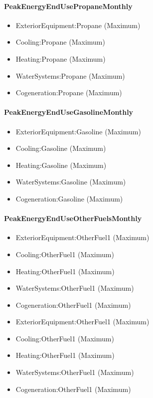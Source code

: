 \paragraph{PeakEnergyEndUsePropaneMonthly}\label{peakenergyendusepropanemonthly}

\begin{itemize}
\item
  ExteriorEquipment:Propane (Maximum)
\item
  Cooling:Propane (Maximum)
\item
  Heating:Propane (Maximum)
\item
  WaterSystems:Propane (Maximum)
\item
  Cogeneration:Propane (Maximum)
\end{itemize}

\paragraph{PeakEnergyEndUseGasolineMonthly}\label{peakenergyendusegasolinemonthly}

\begin{itemize}
\item
  ExteriorEquipment:Gasoline (Maximum)
\item
  Cooling:Gasoline (Maximum)
\item
  Heating:Gasoline (Maximum)
\item
  WaterSystems:Gasoline (Maximum)
\item
  Cogeneration:Gasoline (Maximum)
\end{itemize}

\paragraph{PeakEnergyEndUseOtherFuelsMonthly}\label{peakenergyenduseotherfuelsmonthly}

\begin{itemize}
\item
  ExteriorEquipment:OtherFuel1 (Maximum)
\item
  Cooling:OtherFuel1 (Maximum)
\item
  Heating:OtherFuel1 (Maximum)
\item
  WaterSystems:OtherFuel1 (Maximum)
\item
  Cogeneration:OtherFuel1 (Maximum)
\item
  ExteriorEquipment:OtherFuel1 (Maximum)
\item
  Cooling:OtherFuel1 (Maximum)
\item
  Heating:OtherFuel1 (Maximum)
\item
  WaterSystems:OtherFuel1 (Maximum)
\item
  Cogeneration:OtherFuel1 (Maximum)
\end{itemize}


